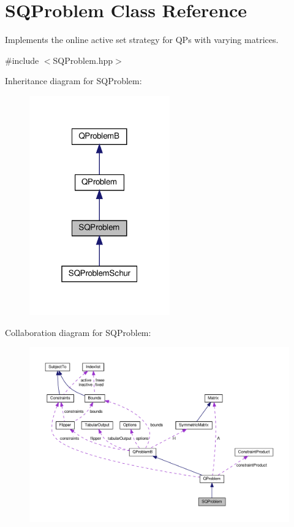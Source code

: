 \hypertarget{class_s_q_problem}{}\section{S\+Q\+Problem Class Reference}
\label{class_s_q_problem}


Implements the online active set strategy for Q\+Ps with varying matrices.  




{\ttfamily \#include $<$S\+Q\+Problem.\+hpp$>$}



Inheritance diagram for S\+Q\+Problem\+:
\nopagebreak
\begin{figure}[H]
\begin{center}
\leavevmode
\includegraphics[width=172pt]{class_s_q_problem__inherit__graph}
\end{center}
\end{figure}


Collaboration diagram for S\+Q\+Problem\+:
\nopagebreak
\begin{figure}[H]
\begin{center}
\leavevmode
\includegraphics[width=350pt]{class_s_q_problem__coll__graph}
\end{center}
\end{figure}
